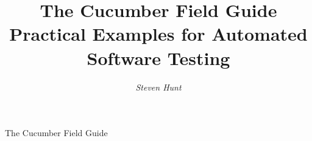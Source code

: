 
\blankpage

\begin{center}
\Huge{\textsf{The Cucumber Field Guide}}
\end{center}
\normalsize
\thispagestyle{empty}

\blankpage

\begin{titlepage}
\centering
\title{%
  \Huge{\textsf{The Cucumber Field Guide}} \\
  \textsf{\large{Practical Examples for Automated Software Testing}}}
\author{\textsf{\textit{Steven Hunt}}}
\vfill
{}
\vfill
\end{titlepage}

\clearpage
\maketitle
\thispagestyle{empty}
\pagebreak
